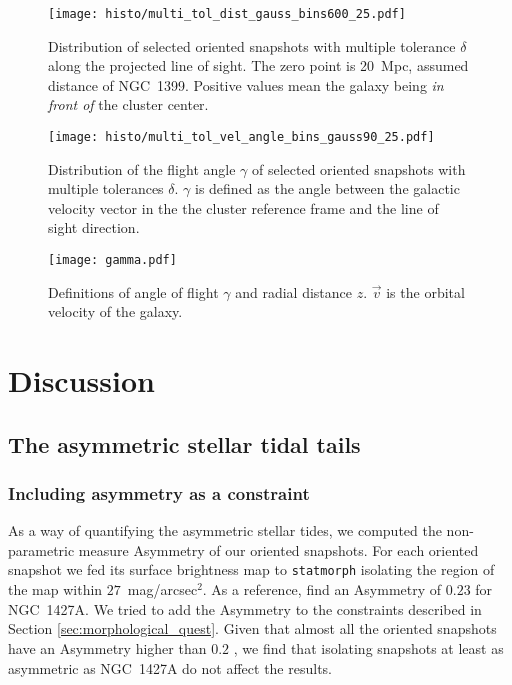\begin{figure}
\centering
\texttt{[image: histo/multi\_tol\_dist\_gauss\_bins600\_25.pdf]}
\caption{Distribution of selected oriented snapshots with multiple tolerance $\delta$ along the projected line of sight. The zero point is 20~Mpc, assumed distance of NGC~1399. Positive values mean the galaxy being \emph{in front of} the cluster center.
}
\label{fig:distance_prediction}
\end{figure}

\begin{figure}
\centering
\texttt{[image: histo/multi\_tol\_vel\_angle\_bins\_gauss90\_25.pdf]}
\caption{Distribution of the flight angle $\gamma$ of selected oriented snapshots with multiple tolerances $\delta$. $\gamma$ is defined as the angle between the galactic velocity vector in the the cluster reference frame and the line of sight direction.
}
\label{fig:velocity_prediction}
\end{figure}
\begin{figure}
\centering
\texttt{[image: gamma.pdf]}
\caption{Definitions of angle of flight $\gamma$ and radial distance $z$. $\vec v$ is the orbital velocity of the galaxy.
}
\label{fig:gamma}
\end{figure}

\section{Discussion} \label{sec:discussion}

\subsection{The asymmetric stellar tidal tails}

\subsubsection{Including asymmetry as a constraint}
As a way of quantifying the asymmetric stellar tides, we computed the non-parametric measure Asymmetry \citep[as defined by][]{Lotz2004} of our oriented snapshots. For each oriented snapshot we fed its surface brightness map to \verb|statmorph| \citep{Rodriguez-Gomez2019} isolating the region of the map within $27$~mag/arcsec$^2$.
As a reference, \citet{Su2021} find an Asymmetry of $0.23$ for NGC~1427A.
We tried to add the Asymmetry to the constraints described in Section \ref{sec:morphological_quest}. Given that almost all the oriented snapshots have an Asymmetry higher than $0.2$ \citep[in line with the average of $0.53\pm0.22$ for galaxies with intense star formation as reported by][]{Conselice2003}, we find that isolating snapshots at least as asymmetric as NGC~1427A do not affect the results.

